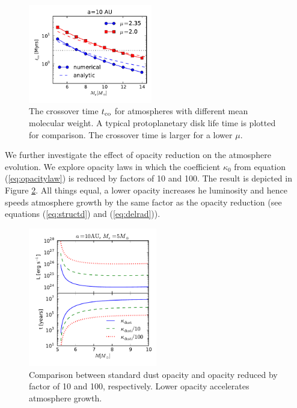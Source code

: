\documentclass[apj]{emulateapj}
\begin{document}
\begin{figure}[h]
\centering
\includegraphics[width=0.48\textwidth]{../../figs/ModelAtmospheres/RadSelfGravPoly/PaperFigs/coolingtime_vs_Mc_10au.pdf}
\caption{The crossover time $t_{\rm{co}}$ for atmospheres with different mean molecular weight. A typical protoplanetary disk life time is plotted for comparison. The crossover time is larger for a lower $\mu$.}
\label{fig:tvsMcomp}
\end{figure}

We further investigate the effect of opacity reduction on the atmosphere evolution. We explore opacity laws in which the coefficient $\kappa_0$ from equation (\ref{eq:opacitylaw})  is reduced by factors of 10 and 100. The result is depicted in Figure \ref{fig:LtvsMopacity}. All things equal, a lower opacity increases he luminosity and hence speeds atmosphere growth by the same factor as the opacity reduction (see equations (\ref{eq:structd}) and (\ref{eq:delrad})). 
 

 \begin{figure}[h]
\centering
\includegraphics[width=0.5\textwidth]{../../figs/ModelAtmospheres/RadSelfGravPoly/PaperFigs/opacity_effect.pdf}
\caption{Comparison between standard dust opacity and opacity reduced by factor of 10 and 100, respectively. Lower opacity accelerates atmosphere growth.}
\label{fig:LtvsMopacity}
\end{figure}
\end{document}
